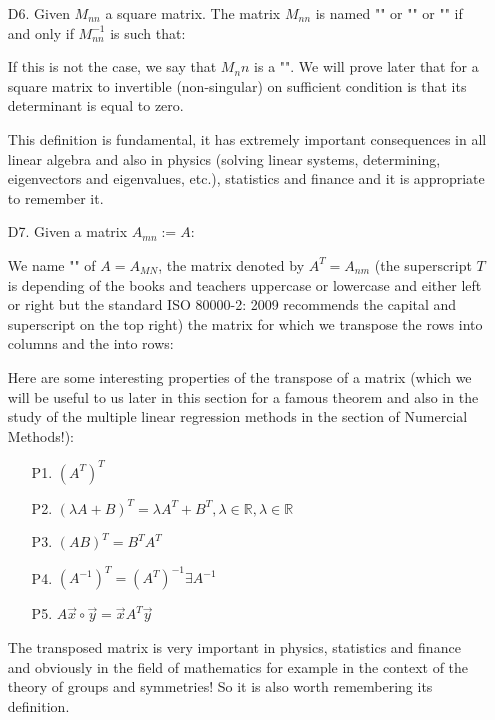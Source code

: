 \begin{enumerate}
		
		\item[D6.] Given $M_{nn}$ a square matrix. The matrix $M_{nn}$ is named "" or "" or "" if and only if $M_{nn}^{-1}$ is such that:
		
		If this is not the case, we say that $M_nn$ is a "". We will prove later that for a square matrix to invertible (non-singular) on sufficient condition is that its determinant is equal to zero.
		
		This definition is fundamental, it has extremely important consequences in all linear algebra and also in physics (solving linear systems, determining, eigenvectors and eigenvalues, etc.), statistics and finance and it is appropriate to remember it.
		
		\item[D7.] Given a matrix $A_{mn}:=A$:
		
		We name "" of $A=A_ {MN}$, the matrix denoted by $A^T=A_{nm}$  (the superscript $T$ is depending of the books and teachers uppercase or lowercase and either left or right but the standard ISO 80000-2: 2009 recommends the capital and superscript on the top right) the matrix for which we transpose the rows into columns and the into rows:
		
		Here are some interesting properties of the transpose of a matrix (which we will be useful to us later in this section for a famous theorem and also in the study of the multiple linear regression methods in the section of Numercial Methods!):
		\begin{enumerate}
			\item[P1.] $(A^T)^T$
			\item[P2.] $(\lambda A+B)^T=\lambda A^T+B^T,\lambda\in \mathbb{R},\lambda\in \mathbb{R}$
			\item[P3.] $(AB)^T=B^TA^T$
			\item[P4.] $(A^{-1})^T=(A^T)^{-1}\exists A^{-1}$
			\item[P5.] $A\vec{x}\circ\vec{y}=\vec{x}A^T\vec{y}$
		\end{enumerate}
		The transposed matrix is very important in physics, statistics and finance and obviously in the field of mathematics for example in the context of the theory of groups and symmetries! So it is also worth remembering its definition.
		

\end{enumerate}
